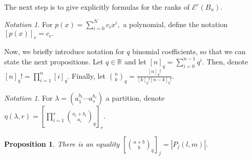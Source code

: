 \documentclass[10 pt]{amsart}
\theoremstyle{plain}
\newtheorem{prop}[thm]{Proposition}
\theoremstyle{definition}
\theoremstyle{remark}
\newtheorem{note}[thm]{Notation}
\numberwithin{equation}{section}
\newcommand\BR{{\mathbb R}}
\begin{document}
The next step is to give explicitly formulas for the ranks of $\mathcal E^r(B_n).$

\begin{note}
For $p(x) = \sum_{i=0}^N c_ix^i,$ a polynomial, define the notation $[p(x)]_r = c_r.$
\end{note}

Now, we briefly introduce notation for $q$ binomial coefficients, so that we can state the next propositions. Let $q \in \BR$ and let $[n]_q = \sum_{i=0}^{n-1} q^i.$ Then, denote $[n]_q! = \prod_{i=1}^n [i]_q.$ Finally, let $\binom n k_q = \frac{[n]_q!}{[k]_q![n-k]_q!}.$

\begin{note}
For $\lambda = (a_1^{b_1} \cdots a_s^{b_s})$ a partition, denote $\eta(\lambda,r) = \left[\prod_{i=1}^s \binom{a_i+b_i}{a_i}_q\right]_r.$
\end{note}

\begin{prop}
\cite[Proposition 1.3.19]{enumerative_comb}
\label{prop:counting_box_partitions}
There is an equality $[\binom {a+b} b_q]_j = |P_j(l,m)|.$
\end{prop}
\end{document}
